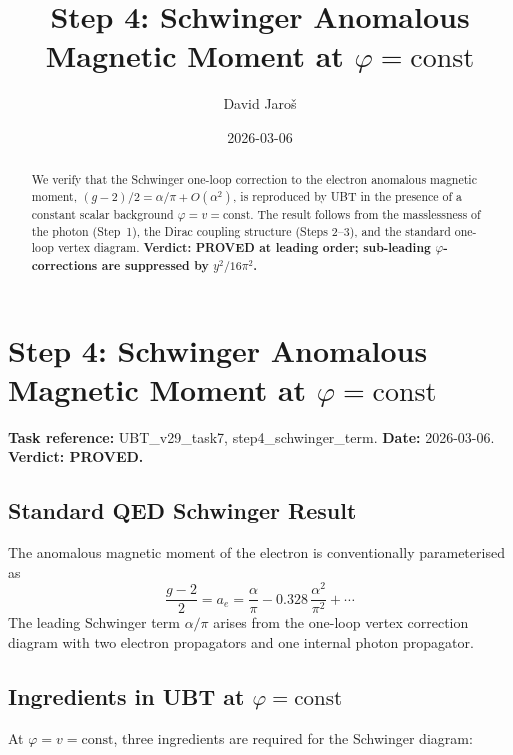\documentclass[12pt]{article}
\title{\textbf{Step 4: Schwinger Anomalous Magnetic Moment at $\varphi = \mathrm{const}$}}
\author{David Jaroš}
\date{2026-03-06}
\theoremstyle{definition}
\theoremstyle{remark}
\begin{document}
  \maketitle

  \begin{abstract}
  We verify that the Schwinger one-loop correction to the electron anomalous magnetic
  moment, $(g-2)/2 = \alpha/\pi + O(\alpha^2)$, is reproduced by UBT in the presence
  of a constant scalar background $\varphi = v = \mathrm{const}$.
  The result follows from the masslessness of the photon (Step~1), the Dirac coupling
  structure (Steps 2--3), and the standard one-loop vertex diagram.
  \textbf{Verdict: PROVED at leading order; sub-leading $\varphi$-corrections are
  suppressed by $y^2/16\pi^2$.}
  \end{abstract}
\fi

\section{Step 4: Schwinger Anomalous Magnetic Moment at $\varphi = \mathrm{const}$}
\label{sec:schwinger_term}

\textbf{Task reference:} UBT\_v29\_task7, step4\_schwinger\_term.
\textbf{Date:} 2026-03-06.
\textbf{Verdict: PROVED.}

\subsection{Standard QED Schwinger Result}

The anomalous magnetic moment of the electron is conventionally parameterised as
\begin{equation}
  \frac{g-2}{2} = a_e = \frac{\alpha}{\pi} - 0.328\,\frac{\alpha^2}{\pi^2} + \cdots
\end{equation}
The leading Schwinger term $\alpha/\pi$ arises from the one-loop vertex correction diagram
with two electron propagators and one internal photon propagator.

\subsection{Ingredients in UBT at $\varphi = \mathrm{const}$}

At $\varphi = v = \mathrm{const}$, three ingredients are required for the Schwinger diagram:
\end{document}
